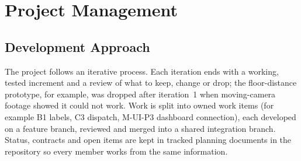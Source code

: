 \chapter{Project Management}
\label{ch:mgmt}

\section{Development Approach}
The project follows an iterative process. Each iteration ends with a working, tested increment and a review of what to keep, change or drop; the floor-distance prototype, for example, was dropped after iteration~1 when moving-camera footage showed it could not work. Work is split into owned work items (for example B1 labels, C3 dispatch, M-UI-P3 dashboard connection), each developed on a feature branch, reviewed and merged into a shared integration branch. Status, contracts and open items are kept in tracked planning documents in the repository so every member works from the same information.

